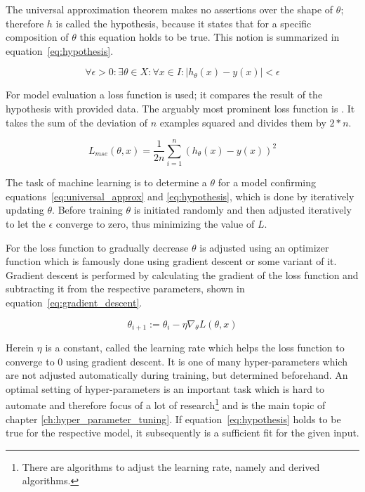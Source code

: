 The universal approximation theorem makes no assertions over the shape of $\theta$; therefore $h$ is called the hypothesis, because it states that for a specific composition of $\theta$ this equation holds to be true.
This notion is summarized in equation~\eqref{eq:hypothesis}.

\begin{equation}
    \forall \epsilon > 0 : \exists \theta \in X : \forall x \in I : |
    h_\theta(x) - y(x) | < \epsilon
    \label{eq:hypothesis}
\end{equation}

For model evaluation a loss function is used; it compares the result of the hypothesis with provided data.
The arguably most prominent loss function is .
It takes the sum of the deviation of $n$ examples squared and divides them by $2*n$.

\begin{equation}
    L_{mse}(\theta, x) = \frac{1}{2 n} \sum_{i=1}^n (h_\theta(x) - y(x))^2
    \label{eq:mse}
\end{equation} 

The task of machine learning is to determine a $\theta$ for a model confirming equations~\ref{eq:universal_approx} and \ref{eq:hypothesis}, which is done by iteratively updating $\theta$. 
Before training $\theta$ is initiated randomly and then adjusted iteratively to let the $\epsilon$ converge to zero, thus minimizing the value of $L$.

For the loss function to gradually decrease $\theta$ is adjusted using an optimizer function which is famously done using gradient descent or some variant of it.
Gradient descent is performed by calculating the gradient of the loss function and subtracting it from the respective parameters, shown in equation~\eqref{eq:gradient_descent}.

\begin{equation}
    \theta_{i+1} := \theta_i - \eta \nabla_\theta L(\theta, x)
    \label{eq:gradient_descent}
\end{equation}

Herein $\eta$ is a constant, called the learning rate which helps the loss function to converge to 0 using gradient descent.
It is one of many hyper-parameters which are not adjusted automatically during training, but determined beforehand.
An optimal setting of hyper-parameters is an important task which is hard to automate and therefore focus of a lot of research\footnote{There are algorithms to adjust the learning rate, namely  \cite{Duchi2010} and derived algorithms.} and is the main topic of chapter \ref{ch:hyper_parameter_tuning}.
If equation~\eqref{eq:hypothesis} holds to be true for the respective model, it subsequently is a sufficient fit for the given input.

